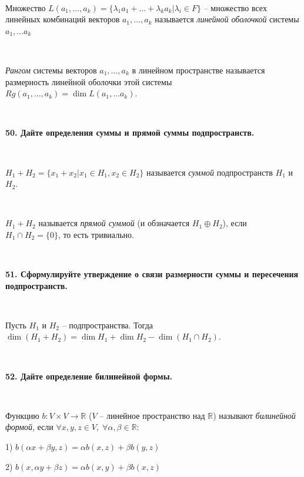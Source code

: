 \documentclass{article}
\begin{document}
	{
		$\;$
		\setlength{\parindent}{0.4cm}
		\hangindent=0.4cm
		
		Множество $L(a_1, \ldots, a_k)=\{\lambda_1a_1+\ldots+\lambda_ka_k|\lambda_i\in F \}$ -- множество всех линейных комбинаций векторов $a_1, \ldots, a_k$ называется \textit{линейной оболочкой} системы $a_1, \ldots a_k$
		
		$\;$
		
		\textit{Рангом} системы векторов $a_1, \ldots, a_k$ в линейном пространстве называется размерность линейной оболочки этой системы $Rg(a_1, \ldots, a_k)=\dim L(a_1, \ldots a_k)$.
		
		$\;$
		\setlength{\parindent}{0cm}
		\hangindent=0cm
	}
	
	\textbf{50. Дайте определения суммы и прямой суммы подпространств.}
	
	{
		$\;$
		\setlength{\parindent}{0.4cm}
		\hangindent=0.4cm
		
		$H_1+H_2=\{x_1+x_2|x_1\in H_1, x_2\in H_2 \}$ называется \textit{суммой} подпространств $H_1$ и $H_2$.
		
		$\;$
		
		$H_1+H_2$ называется \textit{прямой суммой} (и обзначается $H_1\oplus H_2$), если $H_1\cap H_2=\{0\}$, то есть тривиально.
		
		$\;$
		\setlength{\parindent}{0cm}
		\hangindent=0cm
	}
	
	\textbf{51. Сформулируйте утверждение о связи размерности суммы и пересечения подпространств.}
	
	{
		$\;$
		\setlength{\parindent}{0.4cm}
		\hangindent=0.4cm
		
		Пусть $H_1$ и $H_2$ -- подпространства. Тогда $\dim(H_1+H_2)=\dim H_1+\dim H_2-\dim(H_1\cap H_2)$.
		
		$\;$
		\setlength{\parindent}{0cm}
		\hangindent=0cm
	}
	
	\textbf{52. Дайте определение билинейной формы.}
	
	{
		$\;$
		\setlength{\parindent}{0.4cm}
		\hangindent=0.4cm
		
		Функцию $b:V\times V\rightarrow\mathbb{R}$ ($V$ -- линейное пространство над $\mathbb{R}$)  называют \textit{билинейной формой}, если $\forall x, y, z\in V, \;\forall\alpha, \beta\in\mathbb{R}$:
		
		1) $b(\alpha x+\beta y, z)=\alpha b(x, z)+\beta b(y, z)$
		
		2) $b(x, \alpha y+\beta z)=\alpha b(x, y)+\beta b(x, z)$
		
		$\;$
		\setlength{\parindent}{0cm}
		\hangindent=0cm
	}
	
\end{document}
